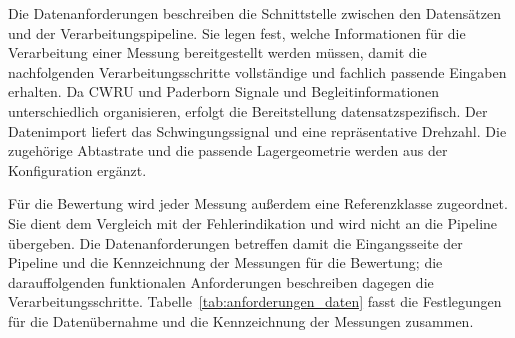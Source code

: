 
Die Datenanforderungen beschreiben die Schnittstelle zwischen den Datensätzen
und der Verarbeitungspipeline. Sie legen fest, welche Informationen für die
Verarbeitung einer Messung bereitgestellt werden müssen, damit die nachfolgenden
Verarbeitungsschritte vollständige und fachlich passende Eingaben erhalten.
Da CWRU und Paderborn Signale und Begleitinformationen unterschiedlich
organisieren, erfolgt die Bereitstellung datensatzspezifisch. Der Datenimport
liefert das Schwingungssignal und eine repräsentative Drehzahl. Die zugehörige
Abtastrate und die passende Lagergeometrie werden aus der Konfiguration ergänzt.

Für die Bewertung wird jeder Messung außerdem eine Referenzklasse zugeordnet.
Sie dient dem Vergleich mit der Fehlerindikation und wird nicht an die Pipeline
übergeben. Die Datenanforderungen betreffen damit die Eingangsseite der Pipeline
und die Kennzeichnung der Messungen für die Bewertung; die darauffolgenden
funktionalen Anforderungen beschreiben dagegen die Verarbeitungsschritte.
Tabelle~\ref{tab:anforderungen_daten} fasst die Festlegungen für die
Datenübernahme und die Kennzeichnung der Messungen zusammen.

